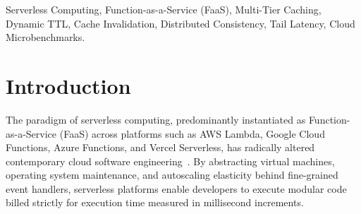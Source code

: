 \documentclass[conference]{IEEEtran}
\begin{document}
\begin{abstract}
Our empirical findings demonstrate that two-tier hierarchical caching ($E_4$) delivers the highest overall system performance, achieving a $2.36\times$ end-to-end client latency speedup and reducing median request latency ($p50$) from $3,250.79\text{ ms}$ to $479.21\text{ ms}$ ($85.3\%$ reduction) by resolving $73.9\%$ of read requests directly from cache tiers ($48.6\%$ in $L_1$ RAM, $25.4\%$ in $L_2$ Redis). Internally, process-local memory lookups execute in $0.05\text{ ms}$, representing an acceleration factor exceeding $3,800\times$ over authoritative database queries ($691.10\text{ ms}$). Furthermore, we prove that adaptive admission successfully eliminates cache pollution by filtering transient ``one-hit wonders,'' while dynamic TTL scales entry retention from $5\text{s}$ to $300\text{s}$ proportionally to empirical access frequency. Finally, we characterize the fundamental architectural trade-off between read acceleration and write/delete consistency: maintaining strict cross-instance freshness via synchronized version tombstones ($E_6$) eliminates $>99.9\%$ of stale reads across concurrent serverless instances, but extracts a $17.8\%$ latency penalty on mutating operations ($3,708\text{ ms}$ vs. $3,130\text{ ms}$). We formally trace the multi-objective Pareto efficiency frontier, proving that hierarchical hybrid caching represents the globally optimal design for latency-sensitive cloud microservices.
\end{abstract}

\begin{IEEEkeywords}
Serverless Computing, Function-as-a-Service (FaaS), Multi-Tier Caching, Dynamic TTL, Cache Invalidation, Distributed Consistency, Tail Latency, Cloud Microbenchmarks.
\end{IEEEkeywords}

\section{Introduction}
The paradigm of serverless computing, predominantly instantiated as Function-as-a-Service (FaaS) across platforms such as AWS Lambda, Google Cloud Functions, Azure Functions, and Vercel Serverless, has radically altered contemporary cloud software engineering~\cite{zaharia2021}. By abstracting virtual machines, operating system maintenance, and autoscaling elasticity behind fine-grained event handlers, serverless platforms enable developers to execute modular code billed strictly for execution time measured in millisecond increments.
\end{document}
